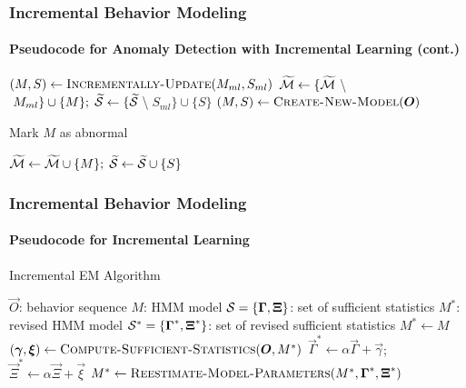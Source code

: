 
\begin{frame}
    \frametitle{Incremental Behavior Modeling}
    \framesubtitle{Pseudocode for Anomaly Detection with 
        Incremental Learning (cont.)}

    \begin{algorithm}[H]
        \begin{algorithmic}
        
                \STATE $( M, S ) \gets \textsc{Incrementally-Update}(M_{ml}, S_{ml})$ 
                \STATE $\widetilde{\cal M} \gets \{ \widetilde{\cal
                    M}\;$\textbackslash$\;M_{ml} \} \cup \{ M \}; \; \widetilde{\cal S} \gets \{ \widetilde{\cal
                    S}\;$\textbackslash$\;S_{ml} \} \cup \{ S \}$ 
            \ELSE 
                \STATE $( M, S ) \gets \textsc{Create-New-Model}(\vec{O})$

                    \STATE Mark $M$ as abnormal 
                \ENDIF

                \STATE $\widetilde{\cal M} \gets \widetilde{\cal M} \cup \{ M \}; \; \widetilde{\cal S} \gets \widetilde{\cal S} \cup \{ S \}$ 
            \ENDIF
        \end{algorithmic}
    \end{algorithm}

\end{frame}


\begin{frame}
    \frametitle{Incremental Behavior Modeling}
    \framesubtitle{Pseudocode for Incremental Learning}

    \begin{algorithm}[H]
        \caption{Incremental EM Algorithm}
        \label{incremental-em-algorithm}
        \begin{algorithmic}
            \REQUIRE $\vec{O}$: behavior sequence
            \REQUIRE $M$: HMM model
            \REQUIRE ${\cal S} = \{ \vec{\Gamma}, \vec{\Xi} \}$: set of sufficient statistics
            \ENSURE $M^*$: revised HMM model
            \ENSURE ${\cal S}^* = \{ \vec{\Gamma}^*, \vec{\Xi}^* \}$: set of revised sufficient statistics
            \STATE $M^* \gets M$
                \STATE {}
                \STATE $(\vec{\gamma}, \vec{\xi}) \gets \textsc{Compute-Sufficient-Statistics}(\vec{O}, M^*)$
                \STATE $\vec{\Gamma}^* \gets \alpha \vec{\Gamma} + \vec{\gamma}$; \; $\vec{\Xi}^* \gets \alpha \vec{\Xi} + \vec{\xi}$
                \STATE {}
                \STATE $M^* \gets \textsc{Reestimate-Model-Parameters}(M^*, \vec{\Gamma}^*, \vec{\Xi}^*)$
            \ENDFOR
        \end{algorithmic}
    \end{algorithm}

\end{frame}

